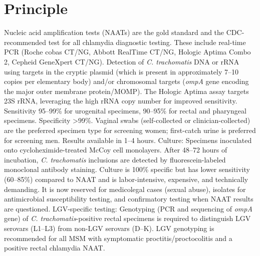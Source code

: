 \section*{Principle}
Nucleic acid amplification tests (NAATs) are the gold standard and the CDC-recommended test for all chlamydia diagnostic testing. These include real-time PCR (Roche cobas CT/NG, Abbott RealTime CT/NG, Hologic Aptima Combo 2, Cepheid GeneXpert CT/NG). Detection of \textit{C. trachomatis} DNA or rRNA using targets in the cryptic plasmid (which is present in approximately 7--10 copies per elementary body) and/or chromosomal targets (\textit{ompA} gene encoding the major outer membrane protein/MOMP). The Hologic Aptima assay targets 23S rRNA, leveraging the high rRNA copy number for improved sensitivity. Sensitivity 95--99\% for urogenital specimens, 90--95\% for rectal and pharyngeal specimens. Specificity >99\%. Vaginal swabs (self-collected or clinician-collected) are the preferred specimen type for screening women; first-catch urine is preferred for screening men. Results available in 1--4 hours. Culture: Specimens inoculated onto cycloheximide-treated McCoy cell monolayers. After 48--72 hours of incubation, \textit{C. trachomatis} inclusions are detected by fluorescein-labeled monoclonal antibody staining. Culture is 100\% specific but has lower sensitivity (60--85\%) compared to NAAT and is labor-intensive, expensive, and technically demanding. It is now reserved for medicolegal cases (sexual abuse), isolates for antimicrobial susceptibility testing, and confirmatory testing when NAAT results are questioned. LGV-specific testing: Genotyping (PCR and sequencing of \textit{ompA} gene) of \textit{C. trachomatis}-positive rectal specimens is required to distinguish LGV serovars (L1--L3) from non-LGV serovars (D--K). LGV genotyping is recommended for all MSM with symptomatic proctitis/proctocolitis and a positive rectal chlamydia NAAT.


